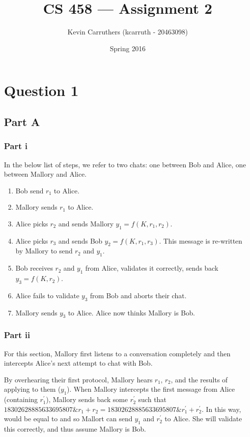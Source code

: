 \documentclass[12pt]{article}
\begin{document}
\title{CS 458 --- Assignment 2}
\author{Kevin Carruthers (kcarruth - 20463098)}
\date{\vspace{-2ex}Spring 2016}
\maketitle\HRule

\section*{Question 1}
\subsection*{Part A}
\subsubsection*{Part i}
In the below list of steps, we refer to two chats: one between Bob and Alice, one between Mallory and Alice.
\begin{enumerate}
\item Bob send $r_1$ to Alice.
\item Mallory sends $r_1$ to Alice.
\item Alice picks $r_2$ and sends Mallory $y_1 = f(K, r_1, r_2)$.
\item Alice picks $r_3$ and sends Bob $y_2 = f(K, r_1, r_3)$. This message is re-written by Mallory to send $r_2$ and $y_1$.
\item Bob receives $r_2$ and $y_1$ from Alice, validates it correctly, sends back $y_3 = f(K, r_2)$.
\item Alice fails to validate $y_3$ from Bob and aborts their chat.
\item Mallory sends $y_3$ to Alice. Alice now thinks Mallory is Bob.
\end{enumerate}

\subsubsection*{Part ii}
For this section, Mallory first listens to a conversation completely and then intercepts Alice's next attempt to chat with Bob.

By overhearing their first protocol, Mallory hears $r_1$, $r_2$, and the results of applying  to them ($y_1$). When Mallory intercepts the first message from Alice (containing $r_1^\prime$), Mallory sends back some $r_2^\prime$ such that $18302628885633695807 \& r_1 + r_2 = 18302628885633695807 \& r_1^\prime + r_2^\prime$. In this way,  would be equal to  and so Mallort can send $y_1$ and $r_2^\prime$ to Alice. She will validate this correctly, and thus assume Mallory is Bob.
\end{document}
